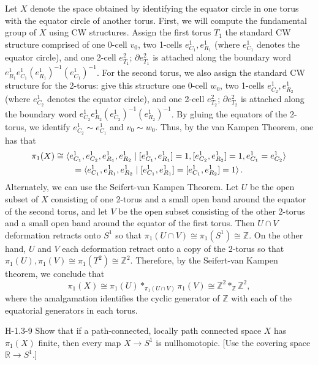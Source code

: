 \documentclass{article}
\begin{document}
	Let $X$ denote the space obtained by identifying the equator circle in one torus with the equator circle of another torus. First, we will compute the fundamental group of $X$ using CW structures. Assign the first torus $T_{1}$ the standard CW structure comprised of one 0-cell $v_{0}$, two 1-cells $e^{1}_{C_{1}}, e^{1}_{R_{1}}$ (where $e^{1}_{C_{1}}$ denotes the equator circle), and one 2-cell $e^{2}_{T_{1}}$; $\partial e^{2}_{T_{1}}$ is attached along the boundary word $e^{1}_{R_{1}}e^{1}_{C_{1}}(e^{1}_{R_{1}})^{-1}(e^{1}_{C_{1}})^{-1}$. For the second torus, we also assign the standard CW structure for the 2-torus: give this structure one 0-cell $w_{0}$, two 1-cells $e^{1}_{C_{2}}, e^{1}_{R_{2}}$ (where $e^{1}_{C_{2}}$ denotes the equator circle), and one 2-cell $e^{2}_{T_{2}}$; $\partial e^{2}_{T_{2}}$ is attached along the boundary word $e_{C_{2}}^{1}e_{R_{2}}^{1}(e_{C_{2}}^{1})^{-1}(e_{R_{2}}^{1})^{-1}$. By gluing the equators of the 2-torus, we identify $e^{1}_{C_{2}} \sim e^{1}_{C_{1}}$ and $v_{0} \sim w_{0}$. Thus, by the van Kampen Theorem, one has that 
	\begin{multline*}
		\pi_{1}(X) \cong \braket{e^{1}_{C_{1}}, e^{1}_{C_{2}}, e^{1}_{R_{1}}, e^{1}_{R_{2}} \mid [e^{1}_{C_{1}}, e^{1}_{R_{1}}] = 1, [e^{1}_{C_{2}}, e^{1}_{R_{2}}] = 1, e^{1}_{C_{1}} = e^{1}_{C_{2}}} \\ = \braket{e^{1}_{C_{1}}, e^{1}_{R_{1}}, e^{1}_{R_{2}} \mid [e^{1}_{C_{1}}, e^{1}_{R_{1}}] = [e^{1}_{C_{1}}, e^{1}_{R_{2}}] = 1}. 
	\end{multline*}
	Alternately, we can use the Seifert-van Kampen Theorem. Let $U$ be the open subset of $X$ consisting of one 2-torus and a small open band around the equator of the second torus, and let $V$ be the open subset consisting of the other 2-torus and a small open band around the equator of the first torus. Then $U \cap V$ deformation retracts onto $S^{1}$ so that $\pi_{1}(U \cap V) \cong \pi_{1}(S^{1}) \cong \mathbb{Z}$. On the other hand, $U$ and $V$ each deformation retract onto a copy of the 2-torus so that $\pi_{1}(U), \pi_{1}(V) \cong \pi_{1}(T^{2}) \cong \mathbb{Z}^{2}$. Therefore, by the Seifert-van Kampen theorem, we conclude that 
	\begin{equation*}
		\pi_{1}(X) \cong \pi_{1}(U) \ast_{\pi_{1}(U \cap V)} \pi_{1}(V) \cong \mathbb{Z}^{2} \ast_{\mathbb{Z}} \mathbb{Z}^{2}, 
	\end{equation*}
	where the amalgamation identifies the cyclic generator of $\mathbb{Z}$ with each of the equatorial generators in each torus. 
	\begin{prb}{H-1.3-9}
		Show that if a path-connected, locally path connected space $X$ has $\pi_{1}(X)$ finite, then every map $X \to S^{1}$ is nullhomotopic. [Use the covering space $\mathbb{R} \to S^{1}$.]
	\end{prb}
\end{document}
